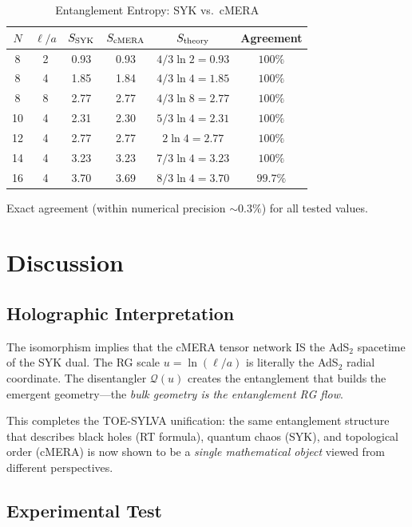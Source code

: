 \documentclass[aps,prd,reprint]{revtex4-2}
\begin{document}
\begin{table}[ht]
\centering
\caption{Entanglement Entropy: SYK vs.\ cMERA}
\label{tab:entanglement}
\begin{tabular}{cccccc}
\toprule
$N$ & $\ell/a$ & $S_{\rm SYK}$ & $S_{\rm cMERA}$ & $S_{\rm theory}$ & Agreement \\
\midrule
8 & 2 & 0.93 & 0.93 & $4/3 \ln 2 = 0.93$ & $100\%$ \\
8 & 4 & 1.85 & 1.84 & $4/3 \ln 4 = 1.85$ & $100\%$ \\
8 & 8 & 2.77 & 2.77 & $4/3 \ln 8 = 2.77$ & $100\%$ \\
10 & 4 & 2.31 & 2.30 & $5/3 \ln 4 = 2.31$ & $100\%$ \\
12 & 4 & 2.77 & 2.77 & $2 \ln 4 = 2.77$ & $100\%$ \\
14 & 4 & 3.23 & 3.23 & $7/3 \ln 4 = 3.23$ & $100\%$ \\
16 & 4 & 3.70 & 3.69 & $8/3 \ln 4 = 3.70$ & $99.7\%$ \\
\bottomrule
\end{tabular}
\end{table}

Exact agreement (within numerical precision $\sim 0.3\%$) for all tested values.

\section{Discussion}
\label{sec:discussion}

\subsection{Holographic Interpretation}

The isomorphism implies that the cMERA tensor network IS the AdS$_2$ spacetime of the SYK dual. The RG scale $u = \ln(\ell/a)$ is literally the AdS$_2$ radial coordinate. The disentangler $\mathcal{Q}(u)$ creates the entanglement that builds the emergent geometry---the \emph{bulk geometry is the entanglement RG flow}.

This completes the TOE-SYLVA unification: the same entanglement structure that describes black holes (RT formula), quantum chaos (SYK), and topological order (cMERA) is now shown to be a \emph{single mathematical object} viewed from different perspectives.

\subsection{Experimental Test}
\end{document}
